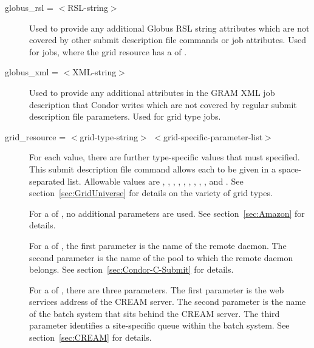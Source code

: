 \begin{description}

\item[globus\_rsl = $<$RSL-string$>$]
Used to provide any additional Globus RSL
string attributes which are not covered by other submit description
file commands or job attributes. Used for  
jobs, where the grid resource has a  of
.


\item[globus\_xml = $<$XML-string$>$]
Used to provide any additional attributes in the GRAM XML job description
that Condor writes which are not covered by regular submit description
file parameters. Used for grid type  jobs.

\item[grid\_resource = $<$grid-type-string$>$ $<$grid-specific-parameter-list$>$ ]
For each  value, 
there are further type-specific values that must specified.
This submit description file command allows each to
be given in a space-separated list.
Allowable  values are
, , , 
, , ,
, , ,
and .
See section~\ref{sec:GridUniverse} for details on the variety of 
grid types.

For a  of , no additional
parameters are used.
See section~\ref{sec:Amazon} for details.

For a  of ,
the first parameter is the name of the remote 
daemon.
The second parameter is the name of the pool to which the remote
 daemon belongs.
See section~\ref{sec:Condor-C-Submit} for details.

For a  of ,
there are three parameters.
The first parameter is the web services address of the CREAM server.
The second parameter is the 
name of the batch system that sits behind the CREAM server.
The third parameter identifies a site-specific queue
within the batch system.
See section~\ref{sec:CREAM} for details.


\end{description}
